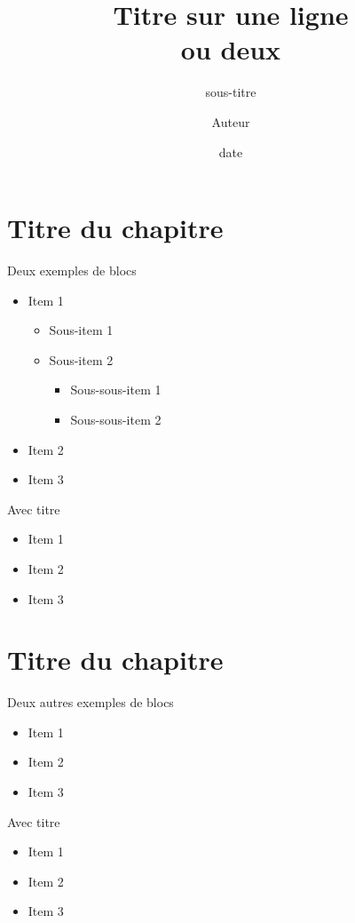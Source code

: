 \documentclass[slideopt,A4,showboxes,svgnames]{beamer}
\title[titrecourt]{Titre sur une ligne\\ ou deux}
\subtitle{sous-titre}
\date[date]{date}
\author[Auteur]{Auteur}
\begin{document}
\begin{frame}
    \titlepage
\end{frame}


\frame{\tocpage}
 
\section{Titre du chapitre}
\frame{\sectionpage}

\begin{frame}{Deux exemples de blocs}
    \begin{block}{}
 \begin{itemize}
    \item{Item 1 }
    \begin{itemize}
        \item {Sous-item 1}
 \item {Sous-item 2}
        \begin{itemize}
        \item {Sous-sous-item 1}
\item {Sous-sous-item 2}
    \end{itemize}
    \end{itemize}
    \item {Item 2}
    \item {Item 3}
    \end{itemize}
  \end{block}
      \begin{block}{Avec titre}
 \begin{itemize}
    \item{Item 1 }
    \item {Item 2}
    \item {Item 3}
    \end{itemize}
  \end{block}
\end{frame}


\section{Titre du chapitre}
 \frame{\sectionpage}


\begin{frame}{Deux autres exemples de blocs}
    \begin{alertblock}{}
 \begin{itemize}
    \item{Item 1 }
    \item {Item 2}
    \item {Item 3}
    \end{itemize}
  \end{alertblock}
      \begin{alertblock}{Avec titre}
 \begin{itemize}
    \item{Item 1 }
    \item {Item 2}
    \item {Item 3}
    \end{itemize}
  \end{alertblock}
\end{frame}
\end{document}

